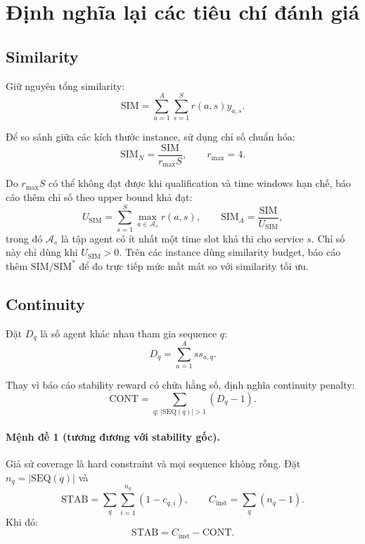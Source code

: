 \documentclass[12pt,a4paper]{article}
\newcommand{\SIM}{\mathrm{SIM}}
\newcommand{\STAB}{\mathrm{STAB}}
\newcommand{\CONT}{\mathrm{CONT}}
\newcommand{\SEQ}{\mathrm{SEQ}}
\begin{document}
\section{Định nghĩa lại các tiêu chí đánh giá}

\subsection{Similarity}

Giữ nguyên tổng similarity:
\begin{equation}
  \SIM=\sum_{a=1}^{A}\sum_{s=1}^{S}r(a,s)y_{a,s}.
  \label{eq:sim}
\end{equation}

Để so sánh giữa các kích thước instance, sử dụng chỉ số chuẩn hóa:
\begin{equation}
  \SIM_N=\frac{\SIM}{r_{\max}S},
  \qquad r_{\max}=4.
  \label{eq:sim-normalized}
\end{equation}

Do $r_{\max}S$ có thể không đạt được khi qualification và time windows hạn
chế, báo cáo thêm chỉ số theo upper bound khả đạt:
\begin{equation}
  U_{\SIM}=\sum_{s=1}^{S}\max_{a\in\mathcal A_s}r(a,s),
  \qquad
  \SIM_A=\frac{\SIM}{U_{\SIM}},
  \label{eq:sim-attainable}
\end{equation}
trong đó $\mathcal A_s$ là tập agent có ít nhất một time slot khả thi cho
service $s$. Chỉ số này chỉ dùng khi $U_{\SIM}>0$. Trên các instance dùng similarity budget, báo cáo thêm
$\SIM/\SIM^*$ để đo trực tiếp mức mất mát so với similarity tối ưu.

\subsection{Continuity}

Đặt $D_q$ là số agent khác nhau tham gia sequence $q$:
\begin{equation}
  D_q=\sum_{a=1}^{A}ss_{a,q}.
  \label{eq:distinct-agents}
\end{equation}

Thay vì báo cáo stability reward có chứa hằng số, định nghĩa continuity penalty:
\begin{equation}
  \CONT=\sum_{q:\,|\SEQ(q)|>1}(D_q-1).
  \label{eq:continuity-penalty}
\end{equation}

\paragraph{Mệnh đề 1 (tương đương với stability gốc).}
Giả sử coverage là hard constraint và mọi sequence không rỗng. Đặt
$n_q=|\SEQ(q)|$ và
\begin{equation}
  \STAB=\sum_q\sum_{i=1}^{n_q}(1-c_{q,i}),
  \qquad
  C_{\mathrm{inst}}=\sum_q(n_q-1).
\end{equation}
Khi đó:
\begin{equation}
  \STAB=C_{\mathrm{inst}}-\CONT.
  \label{eq:stab-cont-equivalence}
\end{equation}
\end{document}
